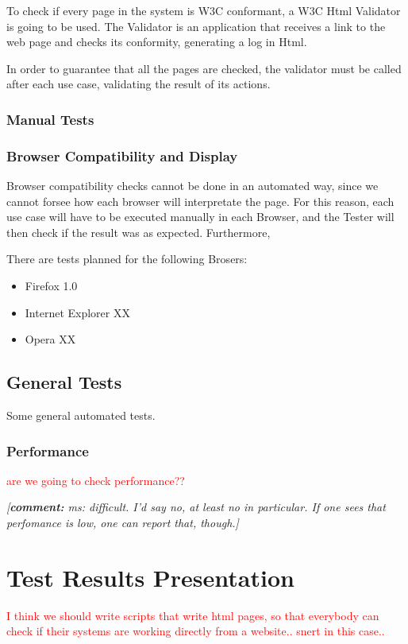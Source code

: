 \documentclass[11pt]{article}
\newcommand{\commentary}[1]{\textsl{\small[\textbf{comment:} #1]}}
\begin{document}
\indent

To check if every page in the system is W3C conformant, a W3C Html Validator is going to be used. The Validator is an application that receives a link to the web page and checks its conformity, generating a log in Html.

In order to guarantee that all the pages are checked, the validator must be called after each use case, validating the result of its actions.

\subsubsection{Manual Tests}

\subsubsection*{Browser Compatibility and Display}

\indent

Browser compatibility checks cannot be done in an automated way, since we cannot forsee how each browser will interpretate the page. For this reason, each use case will have to be executed manually in each Browser, and the Tester will then check if the result was as expected. Furthermore, 

There are tests planned for the following Brosers:

\begin{itemize}

\item Firefox 1.0
\item Internet Explorer XX
\item Opera XX

\end{itemize}

\subsection{General Tests}

\indent 

Some general automated tests.

\subsubsection*{Performance}

\indent

\textcolor{red}{are we going to check performance??}

\commentary{ms: difficult. I'd say no, at least no in particular. If one
  sees that perfomance is low, one can report that, though.}


\section{Test Results Presentation}

\indent

\textcolor{red}{I think we should write scripts that write html pages,
so that everybody can check if their systems are working directly from
a website.. snert in this case..}
\end{document}
